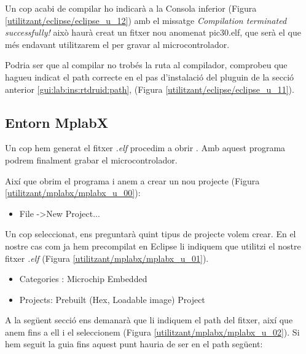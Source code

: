 Un cop acabi de compilar ho indicarà a la Consola inferior (Figura \ref{utilitzant/eclipse/eclipse_u_12}) amb el missatge \emph{Compilation terminated successfully!} això haurà creat un fitxer nou anomenat pic30.elf, que serà el que més endavant utilitzarem el \MplabX per gravar al microcontrolador.


Podria ser que al compilar no trobés la ruta al compilador, comprobeu que hagueu indicat el path correcte en el pas d'instalació del pluguin \RTDruid de la secció anterior \ref{gui:lab:ins:rtdruid:path}, (Figura \ref{utilitzant/eclipse/eclipse_u_11}).


\subsection{Entorn MplabX}

Un cop hem generat el fitxer \emph{.elf} procedim a obrir \MplabX. Amb aquest programa podrem finalment grabar el microcontrolador.

Així que obrim el programa i anem a crear un nou projecte (Figura \ref{utilitzant/mplabx/mplabx_u_00}):

\begin{itemize}
	\item File -\textgreater New Project...
\end{itemize}


Un cop seleccionat, ens preguntarà quint tipus de projecte volem crear. En el nostre cas com ja hem precompilat en Eclipse li indiquem que utilitzi el nostre fitxer \emph{.elf} (Figura \ref{utilitzant/mplabx/mplabx_u_01}).

\begin{itemize}
	\item Categories : Microchip Embedded
	\item Projects:    Prebuilt (Hex, Loadable image) Project
\end{itemize}


A la següent secció ens demanarà que li indiquem el path del fitxer, així que anem fins a ell i el seleccionem (Figura \ref{utilitzant/mplabx/mplabx_u_02}).
Si hem seguit la guia fins aquest punt hauria de ser en el path següent:

